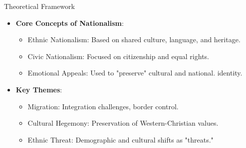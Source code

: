 \documentclass[8pt]{beamer}
\begin{document}
\begin{frame}{Theoretical Framework}

\begin{itemize}
    \item \textbf{Core Concepts of Nationalism}:
    \begin{itemize}
        \item Ethnic Nationalism: Based on shared culture, language, and heritage.
        \item  Civic Nationalism: Focused on citizenship and equal rights.
        \item  Emotional Appeals: Used to "preserve" cultural and national. identity.
    \end{itemize}
    \item \textbf{Key Themes}:
    \begin{itemize}
        \item Migration: Integration challenges, border control.
        \item Cultural Hegemony: Preservation of Western-Christian values.
        \item  Ethnic Threat: Demographic and cultural shifts as "threats."
    \end{itemize}
\end{itemize}
    
\end{frame}
\end{document}
